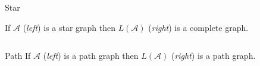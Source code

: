 \documentclass{beamer}
\newcommand{\outdiag}{../thesis/sections/diagrams}
\begin{document}
\begin{frame}{Star}

    If $\mathcal{A}$ (\textit{left}) is a star graph then $L(\mathcal{A})$ (\textit{right}) is a complete graph. \vspace{5mm}

    \begin{columns}[T,onlytextwidth]

        \begin{column}{.46\textwidth}
            \resizebox{\linewidth}{!}{}
        \end{column}

        \hfill

        \begin{column}{.46\textwidth}
            \resizebox{\linewidth}{!}{}
        \end{column}
    \end{columns}
\end{frame}

\begin{frame}{Path}
    If $\mathcal{A}$ (\textit{left}) is a path graph then $L(\mathcal{A})$ (\textit{right}) is a path graph. \vspace{5mm}

    \begin{columns}[T,onlytextwidth]

        \begin{column}{.46\textwidth}
            \resizebox{\linewidth}{!}{}
        \end{column}

        \hfill

        \begin{column}{.46\textwidth}
            \resizebox{\linewidth}{!}{}
        \end{column}
    \end{columns}
\end{frame}
\end{document}
